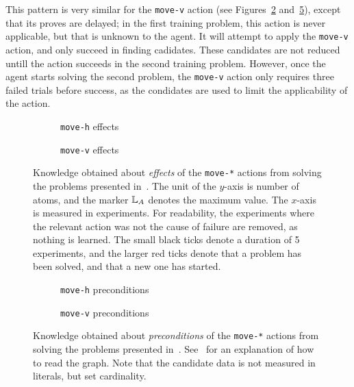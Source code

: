 \documentclass[../Master.tex]{subfiles}
\providecommand{\master}{..}
\begin{document}
This pattern is very similar for the \texttt{move-v} action (see Figures~\ref{fig:res:ekmovev} and~\ref{fig:res:pkmovev}), except that its proves are delayed; in the first training problem, this action is never applicable, but that is unknown to the agent. It will attempt to apply the \texttt{move-v} action, and only succeed in finding cadidates. These candidates are not reduced untill the action succeeds in the second training problem. However, once the agent starts solving the second problem, the \texttt{move-v} action only requires three failed trials before success, as the condidates are used to limit the applicability of the action.

\begin{figure}
    \centering
    \begin{subfigure}{0.45\linewidth}
        \resizebox{\linewidth}{!}{}
        \caption{\texttt{move-h} effects}\label{fig:res:ekmoveh}
    \end{subfigure}
    \begin{subfigure}{0.45\linewidth}
        \resizebox{\linewidth}{!}{}
        \caption{\texttt{move-v} effects}\label{fig:res:ekmovev}
    \end{subfigure}
    \caption{Knowledge obtained about \emph{effects} of the \texttt{move-*} actions from solving the problems presented in~. The unit of the $y$-axis is number of atoms, and the marker $\mathbb{L}_A$ denotes the maximum value. The $x$-axis is measured in experiments. For readability, the experiments where the relevant action was not the cause of failure are removed, as nothing is learned. The small black ticks denote a duration of 5 experiments, and the larger red ticks denote that a problem has been solved, and that a new one has started.}\label{fig:res:ekmove}
\end{figure}

\begin{figure}
    \centering
    \begin{subfigure}{0.42\linewidth}
        \resizebox{\linewidth}{!}{}
        \caption{\texttt{move-h} preconditions}\label{fig:res:pkmoveh}
    \end{subfigure}
    \begin{subfigure}{0.42\linewidth}
        \resizebox{\linewidth}{!}{}
        \caption{\texttt{move-v} preconditions}\label{fig:res:pkmovev}
    \end{subfigure}
    \caption{Knowledge obtained about \emph{preconditions} of the \texttt{move-*} actions from solving the problems presented in~. See~ for an explanation of how to read the graph. Note that the candidate data is not measured in literals, but set cardinality.}\label{fig:res:pkmove}
\end{figure}
\end{document}
